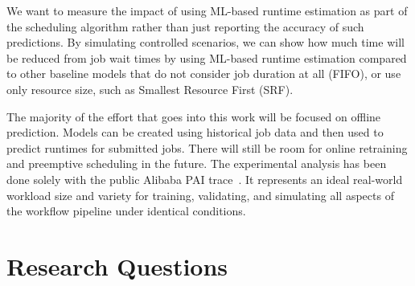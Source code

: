 We want to measure the impact of using ML-based runtime estimation as part of the scheduling algorithm rather than just reporting the accuracy of such predictions. By simulating controlled scenarios, we can show how much time will be reduced from job wait times by using ML-based runtime estimation compared to other baseline models that do not consider job duration at all (FIFO), or use only resource size, such as Smallest Resource First (SRF).

The majority of the effort that goes into this work will be focused on offline prediction. Models can be created using historical job data and then used to predict runtimes for submitted jobs. There will still be room for online retraining and preemptive scheduling in the future. The experimental analysis has been done solely with the public Alibaba PAI trace~\cite{weng2022mlaas}. It represents an ideal real-world workload size and variety for training, validating, and simulating all aspects of the workflow pipeline under identical conditions.

\section{Research Questions}

